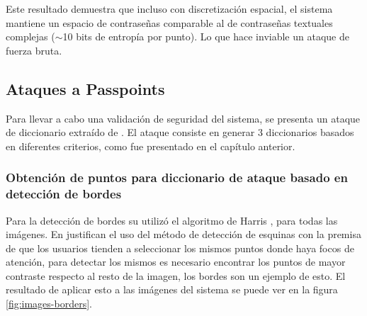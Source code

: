 Este resultado demuestra que incluso con discretización espacial, el sistema mantiene un espacio de contraseñas comparable al de contraseñas textuales complejas ($\sim$10 bits de entropía por punto). Lo que hace inviable un ataque de fuerza bruta.


\subsection{Ataques a Passpoints}
Para llevar a cabo una validaci\'on de seguridad del sistema, se presenta un ataque de diccionario extra\'ido de \cite{van2010purely}. El ataque consiste en generar 3 diccionarios basados en diferentes criterios, como fue presentado en el cap\'itulo anterior.

\subsubsection{Obtenci\'on de puntos para diccionario de ataque basado en detecci\'on de bordes}
Para la detecci\'on de bordes su utiliz\'o el algoritmo de Harris \cite{Harris1988ACC}, para todas las im\'agenes. En \cite{van2010purely} justifican el uso del m\'etodo de detecci\'on de esquinas con la premisa de que los usuarios tienden a seleccionar los mismos puntos donde haya focos de atenci\'on, para detectar los mismos es necesario encontrar los puntos de mayor contraste respecto al resto de la imagen, los bordes son un ejemplo de esto. El resultado de aplicar esto a las im\'agenes del sistema se puede ver en la figura \ref{fig:images-borders}.

